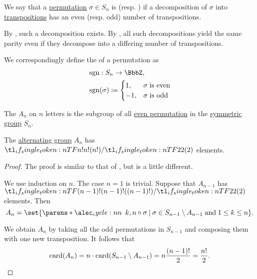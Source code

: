 \begin{definition}\label{def:permutation_parity}
  We say that a \hyperref[def:symmetric_group/permutation]{permutation} \( \sigma \in S_n \) is  (resp. ) if a decomposition of \( \sigma \) into \hyperref[def:symmetric_group/cycle]{transpositions} has an even (resp. odd) number of transpositions.

  By , such a decomposition exists. By , all such decompositions yield the same parity even if they decompose into a differing number of transpositions.

  We correspondingly define the  of a permutation as
  \begin{equation*}
    \begin{aligned}
       &\sgn: S_n \to \BbbZ, \\
       &\sgn(\sigma) \coloneqq \begin{cases}
        1,  &\sigma \T{is even} \\
        -1, &\sigma \T{is odd}
      \end{cases}
    \end{aligned}
  \end{equation*}
\end{definition}

\begin{definition}\label{def:alternating_group}
  The  \( A_n \) on \( n \) letters is the subgroup of all \hyperref[def:permutation_parity]{even permutation} in the \hyperref[def:symmetric_group]{symmetric group} \( S_n \).
\end{definition}

\begin{proposition}\label{thm:alternating_group_cardinality}
  The \hyperref[def:alternating_group]{alternating group} \( A_n \) has \( \ifrac {n!} 2 \) elements.
\end{proposition}
\begin{proof}
  The proof is similar to that of , but is a little different.

  We use induction on \( n \). The case \( n = 1 \) is trivial. Suppose that \( A_{n-1} \) has \( \ifrac {(n-1)!} 2 \) elements. Then
  \begin{equation*}
    A_n = \set{ \cycle{ k, n } \bincirc \sigma \given \sigma \in S_{n-1} \setminus A_{n-1} \T{and} 1 \leq k \leq n }.
  \end{equation*}

  We obtain \( A_n \) by taking all the odd permutations in \( S_{n-1} \) and composing them with one new transposition. It follows that
  \begin{equation*}
    \operatorname{card}(A_n) = n \cdot \operatorname{card}(S_{n-1} \setminus A_{n-1}) = n \frac {(n-1)!} 2 = \frac {n!} 2.
  \end{equation*}
\end{proof}

